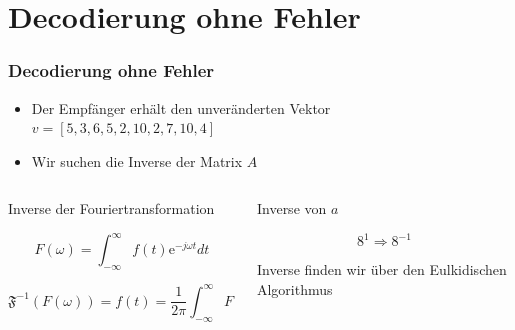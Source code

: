 \documentclass[11pt,aspectratio=169]{beamer}
\begin{document}
\section{Decodierung ohne Fehler}
	\begin{frame}
		\frametitle{Decodierung ohne Fehler}
		
		\begin{itemize}
			\item Der Empfänger erhält den unveränderten Vektor $v = [5,3,6,5,2,10,2,7,10,4]$
			
			\vspace{10pt}
			
			\item Wir suchen die Inverse der Matrix $A$
			
			\vspace{10pt}
			
		\end{itemize}
		
		\begin{columns}[t]
		\begin{column}{0.55\textwidth}		
		Inverse der Fouriertransformation
		\vspace{10pt}

		\[
		F(\omega) = \int_{-\infty}^{\infty} f(t) \mathrm{e}^{-j\omega t} dt
		\]

		\vspace{10pt}

		\[
		\mathfrak{F}^{-1}(F(\omega)) = f(t) = \frac{1}{2 \pi} \int_{-\infty}^{\infty} F(\omega) \mathrm{e}^{j \omega t} d\omega
		\]

		\end{column}
		\begin{column}{0.45\textwidth}		
		Inverse von $a$
		
		\vspace{10pt}
		
		\[
		8^{1} \Rightarrow 8^{-1}
		\]
	
		Inverse finden wir über den Eulkidischen Algorithmus
		\vspace{10pt}
		\end{column}
		\end{columns}		
		
	\end{frame}
\end{document}
